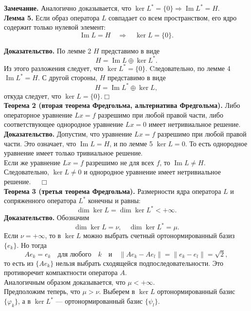\documentclass[12pt,a4paper, titlepage]{article}
\renewcommand{\Im}{\mathop{\mathrm{Im}}\nolimits}
\begin{document}
\textbf{Замечание.} Аналогично доказывается, что $\ker L^* = \{0\} \Rightarrow \Im L^* = H$.\\

\textbf{Лемма 5.} Если образ оператора $L$ совпадает со всем пространством, его ядро содержит только нулевой элемент:
$$
\Im L = H \quad \Rightarrow \quad \ker L = \{0\}.
$$

\textbf{Доказательство.} По лемме 2 $H$ представимо в виде
$$
H = \Im L \oplus \ker L^*.
$$
Из этого разложения следует, что $\ker L^* = \{0\}$. Cледовательно, по лемме 4 $\Im L^* = H$. С другой стороны, $H$ представимо в виде
$$
H = \Im L^* \oplus \ker L,
$$
откуда следует, что $\ker L = \{0\}$.$\Box$\\

\textbf{Теорема 2 (вторая теорема Фредгольма, альтернатива Фредгольма).} Либо операторное уравнение $Lx = f$ разрешимо при любой правой части, либо соответствующее однородное уравнение $Lx = 0$ имеет нетривиальное решение.\\
\textbf{Доказательство.} Допустим, что уравнение $Lx = f$ разрешимо при любой правой части. Это означает, что $\Im L = H$, и по лемме 5 $\ker L = 0$. То есть однородное уравнение имеет только тривиальное решение.\\

Если же уравнение $Lx = f$ разрешимо не для всех $f$, то $\Im L \neq H$. Следовательно, $\ker L \neq 0$ и однородное уравнение имеет нетривиальное решение. $\quad\Box$\\

\textbf{Теорема 3 (третья теорема Фредгольма).} Размерности ядра оператора $L$ и сопряженного оператора $L^*$ конечны и равны:
$$
\dim \ker L = \dim \ker L^* < +\infty.
$$
\textbf{Доказательство.} Обозначим
$$
\dim \ker L = \nu, \quad \dim \ker L^* = \mu.
$$
Если $\nu = +\infty$, то в $\ker L$ можно выбрать счетный ортонормированный базиз $\{e_k\}$. Но тогда
$$
Ae_k = e_k \quad \text{для любого} \quad k \quad \text{и} \quad \|Ae_k - Ae_l\| = \|e_k - e_l\| = \sqrt{2},
$$
то есть из $\{Ae_k\}$ нельзя выбрать сходящейся подпоследовательности. Это противоречит компактности оператора $A$.\\

Аналогичным образом доказывается, что $\mu < +\infty$.\\

Предположим теперь, что $\mu > \nu$. Выберем в $\ker L$ ортонормированный базис $\{{\varphi}_k\}$, а в $\ker L^*$ --- ортонормированный базис $\{\psi_l\}$.\\
\end{document}
